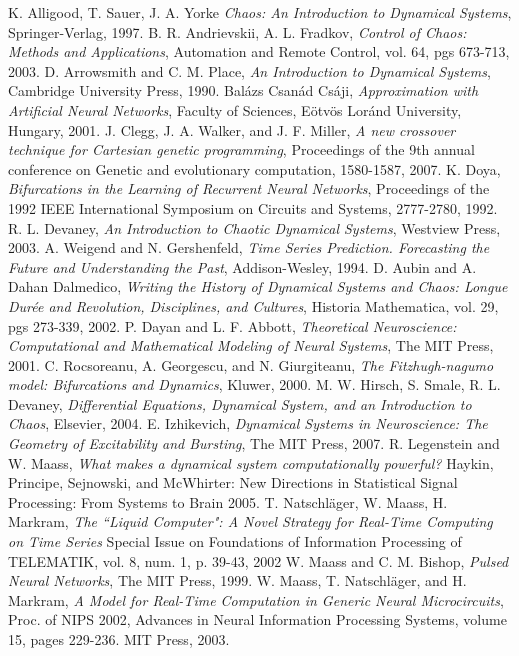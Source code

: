 \documentclass[12pt]{article}
\begin{document}
\begin{thebibliography}{widest-label}
 K. Alligood, T. Sauer, J. A. Yorke
 \emph{Chaos:  An Introduction to Dynamical Systems},
 Springer-Verlag, 
 1997.
 B. R. Andrievskii, A. L. Fradkov,
 \emph{Control of Chaos: Methods and Applications},
 Automation and Remote Control,
 vol. 64,
 pgs 673-713,
 2003.
 D. Arrowsmith and C. M. Place,
 \emph{An Introduction to Dynamical Systems},
 Cambridge University Press,
 1990.
 Balázs Csanád Csáji,
 \emph{Approximation with Artificial Neural Networks},
 Faculty of Sciences,
 Eötvös Loránd University,
 Hungary,
 2001.
 J. Clegg, J. A. Walker, and J. F. Miller,
 \emph{A new crossover technique for Cartesian genetic programming},
 Proceedings of the 9th annual conference on Genetic and evolutionary computation,
 1580-1587,
 2007.
 K. Doya,
 \emph{Bifurcations in the Learning of Recurrent Neural Networks},
 Proceedings of the 1992 IEEE International Symposium on Circuits and Systems,
 2777-2780,
 1992.
 R. L. Devaney,
 \emph{An Introduction to Chaotic Dynamical Systems},
 Westview Press,
 2003.
 A. Weigend and N. Gershenfeld,
 \emph{Time Series Prediction.  Forecasting the Future and Understanding the Past},
 Addison-Wesley,
 1994.
 D. Aubin and A. Dahan Dalmedico,
 \emph{Writing the History of Dynamical Systems and Chaos:  Longue Dur\'ee and Revolution, Disciplines, and Cultures},
 Historia Mathematica,
 vol. 29,
 pgs 273-339,
 2002.
 P. Dayan and L. F. Abbott,
 \emph{Theoretical Neuroscience:  Computational and Mathematical Modeling of Neural Systems},
 The MIT Press,
 2001.
 C. Rocsoreanu, A. Georgescu, and N. Giurgiteanu,
 \emph{The Fitzhugh-nagumo model:  Bifurcations and Dynamics},
 Kluwer,
 2000.
 M. W. Hirsch, S. Smale, R. L. Devaney,
 \emph{Differential Equations, Dynamical System, and an Introduction to Chaos},
 Elsevier,
 2004.
 E. Izhikevich,
 \emph{Dynamical Systems in Neuroscience:  The Geometry of Excitability and Bursting},
 The MIT Press,
 2007.
 R. Legenstein and W. Maass,
 \emph{What makes a dynamical system computationally powerful?}
 Haykin, Principe, Sejnowski, and McWhirter:
 New Directions in Statistical Signal Processing:  From Systems to Brain
 2005.
 T. Natschl\"ager, W. Maass, H. Markram,
 \emph{The ``Liquid Computer":  A Novel Strategy for Real-Time Computing on Time Series}
  Special Issue on Foundations of Information Processing of TELEMATIK, 
  vol. 8, 
  num. 1, 
  p. 39-43,
  2002 
 W. Maass and C. M. Bishop,
 \emph{Pulsed Neural Networks},
 The MIT Press,
 1999.
 W. Maass, T. Natschl\"ager, and H. Markram,
 \emph{A Model for Real-Time Computation in Generic Neural Microcircuits},
 Proc. of NIPS 2002, 
 Advances in Neural Information Processing Systems, 
 volume 15, 
 pages 229-236. 
 MIT Press, 
 2003.


\end{thebibliography}
\end{document}
